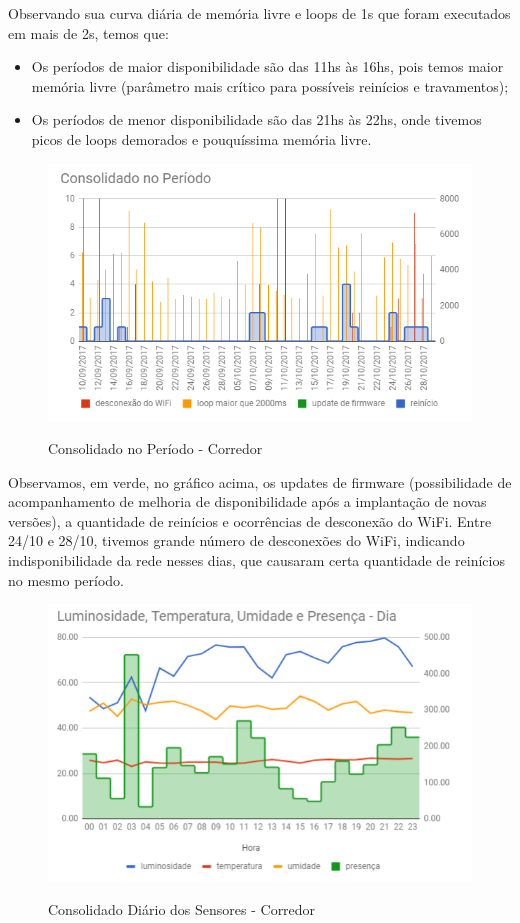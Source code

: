 Observando sua curva diária de memória livre e loops de 1s que foram executados em mais de 2s, temos que:

\begin{itemize}
	\item Os períodos de maior disponibilidade são das 11hs às 16hs, pois temos maior memória livre (parâmetro mais crítico para possíveis reinícios e travamentos);
	\item Os períodos de menor disponibilidade são das 21hs às 22hs, onde tivemos picos de loops demorados e pouquíssima memória livre.
\end{itemize}

\begin{figure}[H]
	\centering
	\caption{Consolidado no Período - Corredor}
	\includegraphics[width=1.0\textwidth]{periodoCorredor}
	\label{fig:periodoCorredor}
\end{figure}

Observamos, em verde, no gráfico acima, os updates de firmware (possibilidade de acompanhamento de melhoria de disponibilidade após a implantação de novas versões), a quantidade de reinícios e ocorrências de desconexão do WiFi. Entre 24/10 e 28/10, tivemos grande número de desconexões do WiFi, indicando indisponibilidade da rede nesses dias, que causaram certa quantidade de reinícios no mesmo período.	

\begin{figure}[H]
	\centering
	\caption{Consolidado Diário dos Sensores - Corredor}
	\includegraphics[width=1.0\textwidth]{sensoresdiaCorredor}
	\label{fig:sensoresdiaCorredor}
\end{figure}

